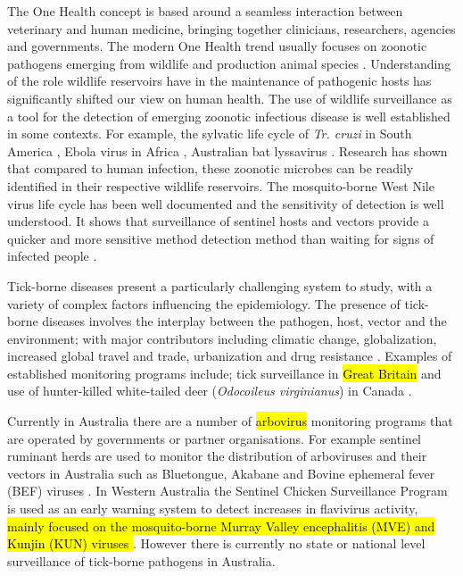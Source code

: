 \documentclass[a4paper, nobind]{templates/ociamthesis}
\begin{document}
The One Health concept is based around a seamless interaction between veterinary and human medicine, bringing together clinicians, researchers, agencies and governments.
The modern One Health trend usually focuses on zoonotic pathogens emerging from wildlife and production animal species \autocite{dayOneHealthImportance2011}.
Understanding of the role wildlife reservoirs have in the maintenance of pathogenic hosts has significantly shifted our view on human health.
The use of wildlife surveillance as a tool for the detection of emerging zoonotic infectious disease is well established in some contexts.
For example, the sylvatic life cycle of \emph{Tr. cruzi} in South America \autocite{denoyaEcologicalOverviewFactors2015}, Ebola virus in Africa \autocite{osterholmTransmissionEbolaViruses2015}, Australian bat lyssavirus \autocite{mayIdentificationFocusAreas2020}.
Research has shown that compared to human infection, these zoonotic microbes can be readily identified in their respective wildlife reservoirs.
The mosquito-borne West Nile virus life cycle has been well documented and the sensitivity of detection is well understood.
It shows that surveillance of sentinel hosts and vectors provide a quicker and more sensitive method detection method than waiting for signs of infected people \autocite{lemonGlobalInfectiousDisease2007}.

Tick-borne diseases present a particularly challenging system to study, with a variety of complex factors influencing the epidemiology.
The presence of tick-borne diseases involves the interplay between the pathogen, host, vector and the environment; with major contributors including climatic change, globalization, increased global travel and trade, urbanization and drug resistance \autocite{dantas-torresClimateChangeBiodiversity2015,kulesChallengesAdvancesDiagnosis2017,gilbertImpactsClimateChange2021}.
Examples of established monitoring programs include; tick surveillance in \hl{Great Britain} \autocite{jamesonTickSurveillanceGreat2011,cullSurveillanceBritishTicks2018} and use of hunter-killed white-tailed deer (\emph{Odocoileus virginianus}) in Canada \autocite{bouchardHarvestedWhitetailedDeer2013}.

Currently in Australia there are a number of \hl{arbovirus} monitoring programs that are operated by governments or partner organisations.
For example sentinel ruminant herds are used to monitor the distribution of arboviruses and their vectors in Australia such as Bluetongue, Akabane and Bovine ephemeral fever (BEF) viruses \autocite{nationalarbovirusmonitoringprogramNationalArbovirusMonitoring2019}.
In Western Australia the Sentinel Chicken Surveillance Program is used as an early warning system to detect increases in flavivirus activity, \hl{mainly focused on the mosquito-borne Murray Valley encephalitis (MVE) and Kunjin (KUN) viruses \autocite{departmentofhealthMedicalEntomologyAnnual2020}}.
However there is currently no state or national level surveillance of tick-borne pathogens in Australia.
\end{document}
